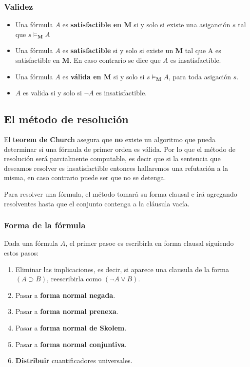 \newpage
\subsubsection{Validez}\label{logica::primerOrden::validez}
\begin{itemize}
\item Una fórmula $A$ es \textbf{satisfactible en M} si y solo si existe una asiganción $s$ tal que $s\models_\textbf{M} A$

\item Una fórmula $A$ es \textbf{satisfactible} si y solo si existe un \textbf{M} tal que A es satisfactible en \textbf{M}. En caso contrario se dice que $A$ es insatisfactible.

\item Una fórmula $A$ es \textbf{válida en M} si y solo si $s \models_\textbf{M} A$, para toda asigación $s$.

\item $A$ es valida si y solo si $\lnot A$ es insatisfactible.
\end{itemize}

\subsection{El método de resolución}

El \textbf{teorem de Church} asegura que \textbf{no} existe un algoritmo que pueda determinar si una fórmula de primer orden es válida. Por lo que el método de resolución será parcialmente computable, es decir que si la sentencia que deseamos resolver es insatisfactible entonces hallaremos una refutación a la misma, en caso contrario puede ser que no se detenga.

Para resolver una fórmula, el método tomará su forma clausal e irá agregando resolventes hasta que el conjunto contenga a la cláusula vacía.

\subsubsection{Forma de la fórmula}
Dada una fórmula $A$, el primer pasoe es escribirla en forma clausal siguiendo estos pasos:
\begin{enumerate}
\item Eliminar las implicaciones, es decir, si aparece una clausula de la forma $(A\supset B)$, reescribirla como $(\lnot A \lor B)$.

\item Pasar a \textbf{forma normal negada}.
\item Pasar a \textbf{forma normal prenexa}.
\item Pasar a \textbf{forma normal de Skolem}.
\item Pasar a \textbf{forma normal conjuntiva}.
\item \textbf{Distribuir} cuantificadores universales.
\end{enumerate}

